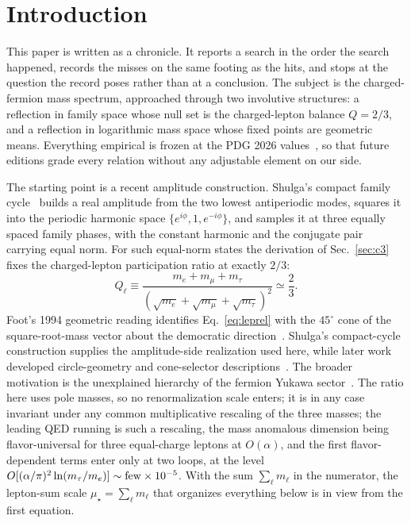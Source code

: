 \documentclass[aps,twocolumn,superscriptaddress,nofootinbib,floatfix]{revtex4-2}
\newcommand{\mstar}{\mu_\star}
\begin{document}
\begin{abstract}
provenance, in the sense of companion work proposing explicit criteria for distinguishing structure from coincidence~\cite{BrilliantPattern}; they are offered for tracking and falsification, not claimed as physics.
\end{abstract}

\maketitle

\section{Introduction}
\label{sec:intro}

This paper is written as a chronicle. It reports a search in the order the search happened, records the misses on the same footing as the hits, and stops at the question the record poses rather than at a conclusion. The subject is the charged-fermion mass spectrum, approached through two involutive structures: a reflection in family space whose null set is the charged-lepton balance $Q=2/3$, and a reflection in logarithmic mass space whose fixed points are geometric means. Everything empirical is frozen at the PDG 2026 values~\cite{PDG2026}, so that future editions grade every relation without any adjustable element on our side.

The starting point is a recent amplitude construction. Shulga's compact family cycle~\cite{Shulga2026} builds a real amplitude from the two lowest antiperiodic modes, squares it into the periodic harmonic space $\{e^{i\phi},1,e^{-i\phi}\}$, and samples it at three equally spaced family phases, with the constant harmonic and the conjugate pair carrying equal norm. For such equal-norm states the derivation of Sec.~\ref{sec:c3} fixes the charged-lepton participation ratio at exactly $2/3$:
\begin{equation}
Q_\ell\equiv
\frac{m_e+m_\mu+m_\tau}
{\left(\sqrt{m_e}+\sqrt{m_\mu}+\sqrt{m_\tau}\right)^2}
\simeq \frac23 .
\label{eq:leprel}
\end{equation}
Foot's 1994 geometric reading identifies Eq.~\eqref{eq:leprel} with the $45^\circ$ cone of the square-root-mass vector about the democratic direction~\cite{Foot1994}. Shulga's compact-cycle construction supplies the amplitude-side realization used here, while later work developed circle-geometry and cone-selector descriptions~\cite{Kocik2012,Li2026QR}. The broader motivation is the unexplained hierarchy of the fermion Yukawa sector~\cite{PDG2026}. The ratio here uses pole masses, so no renormalization scale enters; it is in any case invariant under any common multiplicative rescaling of the three masses; the leading QED running is such a rescaling, the mass anomalous dimension being flavor-universal for three equal-charge leptons at $O(\alpha)$, and the first flavor-dependent terms enter only at two loops, at the level $O[(\alpha/\pi)^2\ln(m_\tau/m_e)]\sim{\rm few}\times10^{-5}$. With the sum $\sum_\ell m_\ell$ in the numerator, the lepton-sum scale $\mstar=\sum_\ell m_\ell$ that organizes everything below is in view from the first equation.
\end{document}
